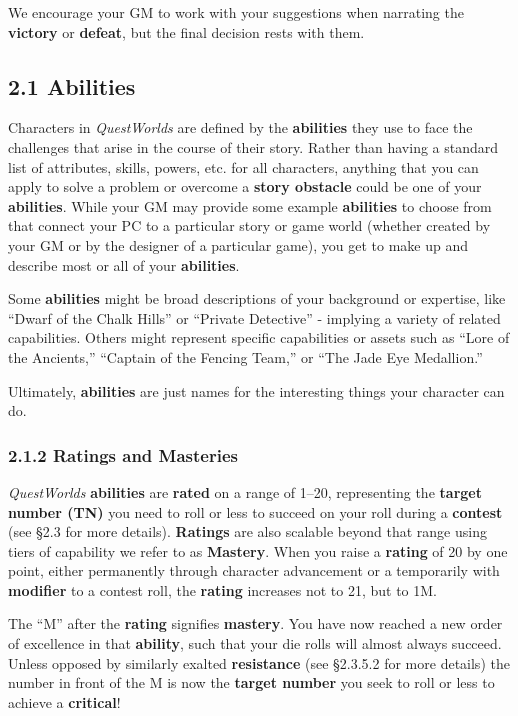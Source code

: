 \documentclass[
]{article}
\begin{document}
We encourage your GM to work with your suggestions when narrating the
\textbf{victory} or \textbf{defeat}, but the final decision rests with
them.

\hypertarget{abilities}{%
\subsection{2.1 Abilities}\label{abilities}}

Characters in \emph{QuestWorlds} are defined by the \textbf{abilities}
they use to face the challenges that arise in the course of their story.
Rather than having a standard list of attributes, skills, powers, etc.
for all characters, anything that you can apply to solve a problem or
overcome a \textbf{story obstacle} could be one of your
\textbf{abilities}. While your GM may provide some example
\textbf{abilities} to choose from that connect your PC to a particular
story or game world (whether created by your GM or by the designer of a
particular game), you get to make up and describe most or all of your
\textbf{abilities}.

Some \textbf{abilities} might be broad descriptions of your background
or expertise, like ``Dwarf of the Chalk Hills'' or ``Private Detective''
- implying a variety of related capabilities. Others might represent
specific capabilities or assets such as ``Lore of the Ancients,''
``Captain of the Fencing Team,'' or ``The Jade Eye Medallion.''

Ultimately, \textbf{abilities} are just names for the interesting things
your character can do.

\hypertarget{ratings-and-masteries}{%
\subsubsection{2.1.2 Ratings and
Masteries}\label{ratings-and-masteries}}

\emph{QuestWorlds} \textbf{abilities} are \textbf{rated} on a range of
1--20, representing the \textbf{target number (TN)} you need to roll or
less to succeed on your roll during a \textbf{contest} (see §2.3 for
more details). \textbf{Ratings} are also scalable beyond that range
using tiers of capability we refer to as \textbf{Mastery}. When you
raise a \textbf{rating} of 20 by one point, either permanently through
character advancement or a temporarily with \textbf{modifier} to a
contest roll, the \textbf{rating} increases not to 21, but to 1M.

The ``M'' after the \textbf{rating} signifies \textbf{mastery}. You have
now reached a new order of excellence in that \textbf{ability}, such
that your die rolls will almost always succeed. Unless opposed by
similarly exalted \textbf{resistance} (see §2.3.5.2 for more details)
the number in front of the M is now the \textbf{target number} you seek
to roll or less to achieve a \textbf{critical}!
\end{document}

